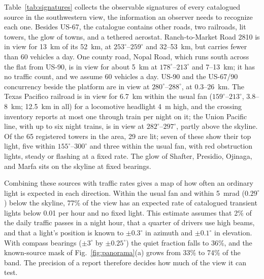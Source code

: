 \documentclass[aip,jap,amsmath,amssymb,reprint,floatfix]{revtex4-2}
\begin{document}
Table~\ref{tab:signatures} collects the observable signatures of every catalogued source in the southwestern view, the information an observer needs to recognize each one. Besides US-67, the catalogue contains other roads, two railroads, lit towers, the glow of towns, and a tethered aerostat. Ranch-to-Market Road 2810 is in view for 13~km of its 52~km, at $253^\circ$--$259^\circ$ and 32--53~km, but carries fewer than 60 vehicles a day. One county road, Nopal Road, which runs south across the flat from US-90, is in view for about 5~km at $178^\circ$--$213^\circ$ and 7--13~km; it has no traffic count, and we assume 60 vehicles a day. US-90 and the US-67/90 concurrency beside the platform are in view at $280^\circ$--$288^\circ$, at 0.3--26~km. The Texas Pacifico railroad is in view for 6.7~km within the usual fan ($159^\circ$--$213^\circ$, 3.8--8~km; 12.5~km in all) for a locomotive headlight 4~m high, and the crossing inventory reports at most one through train per night on it;\cite{FRA_xing} the Union Pacific line, with up to six night trains, is in view at $282^\circ$--$297^\circ$, partly above the skyline. Of the 65 registered towers in the area, 29 are lit; seven of these show their top light, five within $155^\circ$--$300^\circ$ and three within the usual fan, with red obstruction lights, steady or flashing at a fixed rate.\cite{FAA_AC} The glow of Shafter, Presidio, Ojinaga, and Marfa sits on the skyline at fixed bearings.

Combining these sources with traffic rates gives a map of how often an ordinary light is expected in each direction. Within the usual fan and within 5~mrad ($0.29^\circ$) below the skyline, 77\% of the view has an expected rate of catalogued transient lights below 0.01 per hour and no fixed light. This estimate assumes that 2\% of the daily traffic passes in a night hour, that a quarter of drivers use high beams, and that a light's position is known to $\pm0.3^\circ$ in azimuth and $\pm0.1^\circ$ in elevation. With compass bearings ($\pm3^\circ$ by $\pm0.25^\circ$) the quiet fraction falls to 36\%, and the known-source mask of Fig.~\ref{fig:panorama}(a) grows from 33\% to 74\% of the band. The precision of a report therefore decides how much of the view it can test.
\end{document}
